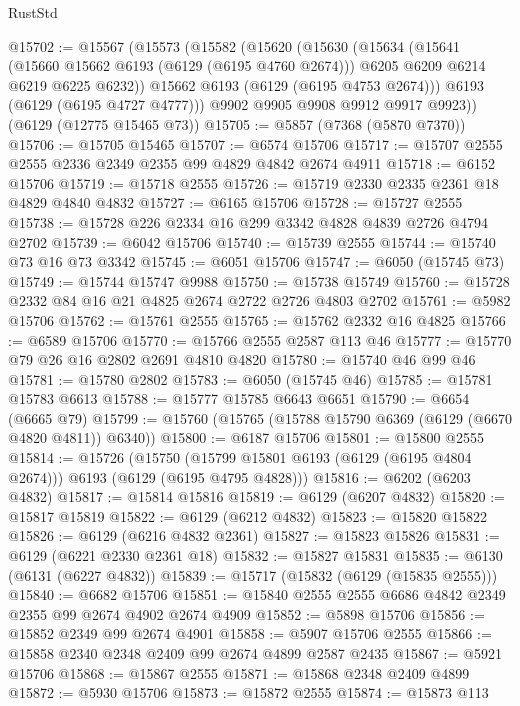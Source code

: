\begin{lexlean}{RustStd}
\begin{coremodule}
@15702 := @15567
    (@15573
      (@15582
        (@15620
          (@15630
            (@15634
              (@15641
                (@15660 @15662 @6193 (@6129 (@6195 @4760 @2674)))
                @6205
                @6209
                @6214
                @6219
                @6225
                @6232))
            @15662
            @6193
            (@6129 (@6195 @4753 @2674)))
          @6193
          (@6129 (@6195 @4727 @4777)))
        @9902
        @9905
        @9908
        @9912
        @9917
        @9923))
    (@6129 (@12775 @15465 @73))
@15705 := @5857 (@7368 (@5870 @7370))
@15706 := @15705 @15465
@15707 := @6574 @15706
@15717 := @15707 @2555 @2555 @2336 @2349 @2355 @99 @4829 @4842 @2674 @4911
@15718 := @6152 @15706
@15719 := @15718 @2555
@15726 := @15719 @2330 @2335 @2361 @18 @4829 @4840 @4832
@15727 := @6165 @15706
@15728 := @15727 @2555
@15738 := @15728 @226 @2334 @16 @299 @3342 @4828 @4839 @2726 @4794 @2702
@15739 := @6042 @15706
@15740 := @15739 @2555
@15744 := @15740 @73 @16 @73 @3342
@15745 := @6051 @15706
@15747 := @6050 (@15745 @73)
@15749 := @15744 @15747 @9988
@15750 := @15738 @15749
@15760 := @15728 @2332 @84 @16 @21 @4825 @2674 @2722 @2726 @4803 @2702
@15761 := @5982 @15706
@15762 := @15761 @2555
@15765 := @15762 @2332 @16 @4825
@15766 := @6589 @15706
@15770 := @15766 @2555 @2587 @113 @46
@15777 := @15770 @79 @26 @16 @2802 @2691 @4810 @4820
@15780 := @15740 @46 @99 @46
@15781 := @15780 @2802
@15783 := @6050 (@15745 @46)
@15785 := @15781 @15783 @6613
@15788 := @15777 @15785 @6643 @6651
@15790 := @6654 (@6665 @79)
@15799 := @15760 (@15765 (@15788 @15790 @6369 (@6129 (@6670 @4820 @4811)) @6340))
@15800 := @6187 @15706
@15801 := @15800 @2555
@15814 := @15726
    (@15750 (@15799 @15801 @6193 (@6129 (@6195 @4804 @2674))) @6193 (@6129 (@6195 @4795 @4828)))
@15816 := @6202 (@6203 @4832)
@15817 := @15814 @15816
@15819 := @6129 (@6207 @4832)
@15820 := @15817 @15819
@15822 := @6129 (@6212 @4832)
@15823 := @15820 @15822
@15826 := @6129 (@6216 @4832 @2361)
@15827 := @15823 @15826
@15831 := @6129 (@6221 @2330 @2361 @18)
@15832 := @15827 @15831
@15835 := @6130 (@6131 (@6227 @4832))
@15839 := @15717 (@15832 (@6129 (@15835 @2555)))
@15840 := @6682 @15706
@15851 := @15840 @2555 @2555 @6686 @4842 @2349 @2355 @99 @2674 @4902 @2674 @4909
@15852 := @5898 @15706
@15856 := @15852 @2349 @99 @2674 @4901
@15858 := @5907 @15706 @2555
@15866 := @15858 @2340 @2348 @2409 @99 @2674 @4899 @2587 @2435
@15867 := @5921 @15706
@15868 := @15867 @2555
@15871 := @15868 @2348 @2409 @4899
@15872 := @5930 @15706
@15873 := @15872 @2555
@15874 := @15873 @113

\end{coremodule}
\end{lexlean}
